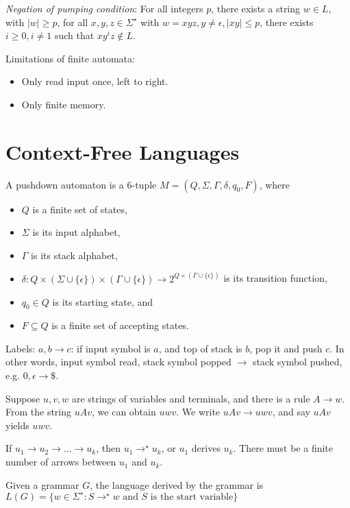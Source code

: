 \documentclass[letterpaper,landscape,11pt]{article}
\begin{document}
\emph{Negation of pumping condition}: For all integers $p$, there exists a string $w \in L$, with $|w| \geq p$, for all $x, y, z \in \Sigma^\star$ with $w = xyz, y \neq \epsilon, |xy| \leq p$, there exists $i \geq 0, i \neq 1$ such that $xy^iz \notin L$.

Limitations of finite automata:
\begin{itemize}
	\item Only read input once, left to right.
	\item Only finite memory.
\end{itemize}

\section{Context-Free Languages}
A pushdown automaton is a 6-tuple $M = (Q, \Sigma, \Gamma, \delta, q_0, F)$, where
\begin{itemize}
	\item $Q$ is a finite set of states,
	\item $\Sigma$ is its input alphabet,
	\item $\Gamma$ is its stack alphabet,
	\item $\delta : Q \times (\Sigma \cup \{\epsilon\}) \times (\Gamma \cup \{\epsilon\}) \rightarrow 2^{Q \times (\Gamma \cup \{\epsilon\})}$ is its transition function,
	\item $q_0 \in  Q$ is its starting state, and
	\item $F \subseteq Q$ is a finite set of accepting states.
\end{itemize}

Labels: $a, b \rightarrow c$: if input symbol is $a$, and top of stack is $b$, pop it and push $c$. In other words, input symbol read, stack symbol popped $\rightarrow$ stack symbol pushed, e.g. $0, \epsilon \rightarrow \$$.

Suppose $u, v, w$ are strings of variables and terminals, and there is a rule $A \rightarrow w$. From the string $uAv$, we can obtain $uwv$. We write $uAv \rightarrow uwv$, and say $uAv$ yields $uwv$.

If $u_1 \rightarrow u_2 \rightarrow \dots \rightarrow u_k$, then $u_1 \rightarrow^\star u_k$, or $u_1$ derives $u_k$. There must be a finite number of arrows between $u_1$ and $u_k$.

Given a grammar $G$, the language derived by the grammar is $L(G) = \{w \in \Sigma^\star : S \rightarrow^\star w \text{ and } S \text{ is the start variable}\}$
\end{document}
